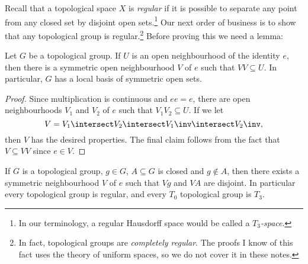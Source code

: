 \documentclass[article, a4paper, 11pt, oneside]{memoir}
\numberwithin{equation}{chapter}
\begin{document}

Recall that a topological space $X$ is \emph{regular} if it is possible to separate any point from any closed set by disjoint open sets.\footnote{In our terminology, a regular Hausdorff space would be called a \emph{$T_3$-space}.} Our next order of business is to show that any topological group is regular.\footnote{In fact, topological groups are \emph{completely regular}. The proofs I know of this fact uses the theory of uniform spaces, so we do not cover it in these notes.} Before proving this we need a lemma:

\begin{lemma}
    \label{thm:symmetric_nhood_of_e}
    Let $G$ be a topological group. If $U$ is an open neighbourhood of the identity $e$, then there is a symmetric open neighbourhood $V$ of $e$ such that $VV \subseteq U$. In particular, $G$ has a local basis of symmetric open sets.
\end{lemma}

\begin{proof}
    Since multiplication is continuous and $ee = e$, there are open neighbourhoods $V_1$ and $V_2$ of $e$ such that $V_1 V_2 \subseteq U$. If we let
    \begin{equation*}
        V = V_1 \intersect V_2 \intersect V_1\inv \intersect V_2\inv,
    \end{equation*}
    then $V$ has the desired properties. The final claim follows from the fact that $V \subseteq VV$ since $e \in V$.
\end{proof}


\begin{proposition}
    \label{thm:topological_group_regular}
    If $G$ is a topological group, $g \in G$, $A \subseteq G$ is closed and $g \not\in A$, then there exists a symmetric neighbourhood $V$ of $e$ such that $Vg$ and $VA$ are disjoint. In particular every topological group is regular, and every $T_0$ topological group is $T_3$.
\end{proposition}
\end{document}
